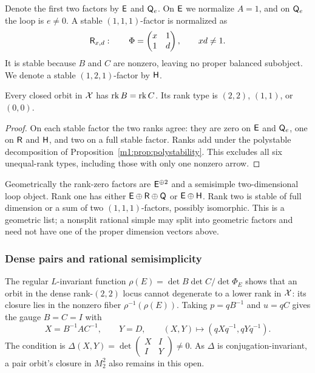 Denote the first two factors by $\mathsf E$ and $\mathsf Q_e$. On $\mathsf E$ we
normalize $A=1$, and on $\mathsf Q_e$ the loop is $e\neq0$. A stable
$(1,1,1)$-factor is normalized as
\begin{equation}\label{m1:eq:R-factor}
 \mathsf R_{x,d}:\qquad \Phi=\begin{pmatrix}x&1\\1&d\end{pmatrix},
 \qquad xd\neq1.
\end{equation}
It is stable because $B$ and $C$ are nonzero, leaving no proper balanced
subobject. We denote a stable $(1,2,1)$-factor by $\mathsf H$.

\begin{corollary}\label{m1:prop:rank-exclusion}
Every closed orbit in $\mathcal X$ has $\operatorname{rk} B=\operatorname{rk} C$. Its rank type is
$(2,2)$, $(1,1)$, or $(0,0)$.
\end{corollary}
\begin{proof}
On each stable factor the two ranks agree: they are zero on $\mathsf E$
and $\mathsf Q_e$, one on $\mathsf R$ and $\mathsf H$, and two on a full stable
factor. Ranks add under the polystable decomposition of
Proposition~\ref{m1:prop:polystability}. This excludes all six unequal-rank
types, including those with only one nonzero arrow.
\end{proof}
Geometrically the rank-zero factors are $\mathsf E^{\oplus2}$ and a
semisimple two-dimensional loop object. Rank one has either
$\mathsf E\oplus\mathsf R\oplus\mathsf Q$ or $\mathsf E\oplus\mathsf H$. Rank two is
stable of full dimension or a sum of two $(1,1,1)$-factors, possibly
isomorphic. This is a geometric list; a nonsplit rational simple may
split into geometric factors and need not have one of the proper
dimension vectors above.

\subsubsection{Dense pairs and rational semisimplicity}\label{m1:subsec:dense-geometry}
The regular $L$-invariant function
$\rho(E)=\det B\det C/\det\Phi_E$ shows that an orbit in the dense
rank-$(2,2)$ locus cannot degenerate to a lower rank in $\mathcal X$: its
closure lies in the nonzero fiber $\rho^{-1}(\rho(E))$.
Taking $p=qB^{-1}$ and $u=qC$ gives the gauge $B=C=I$ with
\begin{equation}\label{m1:eq:dense-gauge}
 X=B^{-1}AC^{-1},\qquad Y=D,
 \qquad (X,Y)\mapsto(qXq^{-1},qYq^{-1}).
\end{equation}
The condition is $\Delta(X,Y)=\det\left(\begin{smallmatrix}X&I\\I&Y\end{smallmatrix}\right)\neq0$.
As $\Delta$ is conjugation-invariant, a pair orbit's closure in $M_2^2$
also remains in this open.

